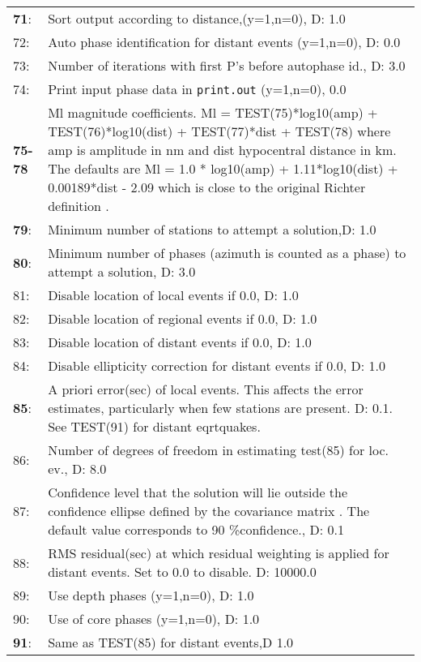\begin{longtable}{lp{14.5cm}}
\textbf{71}: &  	Sort output according to distance,(y=1,n=0), D: 1.0 \\
72: &  	Auto phase identification for distant events (y=1,n=0), D: 0.0 \\
73: &  	Number of iterations with first P's before autophase id., D: 3.0 \\
74: &  	Print input phase data in \texttt{print.out} (y=1,n=0), 0.0 \\
\textbf{75-78} &  Ml m\index{Magnitude}agnitude coefficients. Ml = TEST(75)*log10(amp) + TEST(76)*log10(dist) + TEST(77)*dist + TEST(78) where amp is amplitude in nm and dist hypocentral distance in km. The defaults are \index{Ml}\index{Local magnitude parameters}Ml = 1.0 * log10(amp) + 1.11*log10(dist) + 0.00189*dist - 2.09 which is close to the original Richter definition \citep{hutton1987}. \\
\textbf{79}: &  	\index{Location, min \# of stations}Minimum number of stations to attempt a solution,D: 1.0 \\
\textbf{80}: &  	Minimum number of phases (azimuth is counted as a phase) to attempt a  solution, D: 
3.0 \\
81: &  	Disable location of local events if 0.0, D: 1.0 \\
82: &  	Disable location of regional events if 0.0, D: 1.0 \\
83: &  	Disable location of distant events if 0.0, D: 1.0 \\
84: &  	Disable ellipticity correction for distant events if 0.0, D: 1.0 \\
\textbf{85}: &  A priori error(sec) of local events. This affects the \index{Error estimate, HYP}error estimates, particularly when few stations are present. D: 0.1. See TEST(91) for distant eqrtquakes. \\
86: &  	Number of degrees of freedom in estimating test(85) for loc. ev., D: 8.0  \\
87: &  	Confidence level that the solution will lie outside the confidence ellipse defined by the covariance  matrix . The default value corresponds to 90 \%confidence., D: 0.1 \\
88: &  \index{Residual weight}RMS residual(sec) at which residual weighting is applied for distant events. Set to 0.0 to disable. D: 10000.0 \\
89: &  	Use depth phases (y=1,n=0), D: 1.0 \\
90: &  	Use of core phases (y=1,n=0), D: 1.0 \\
\textbf{91}: &  	Same as TEST(85) for distant events,D 1.0 \\

\end{longtable}
